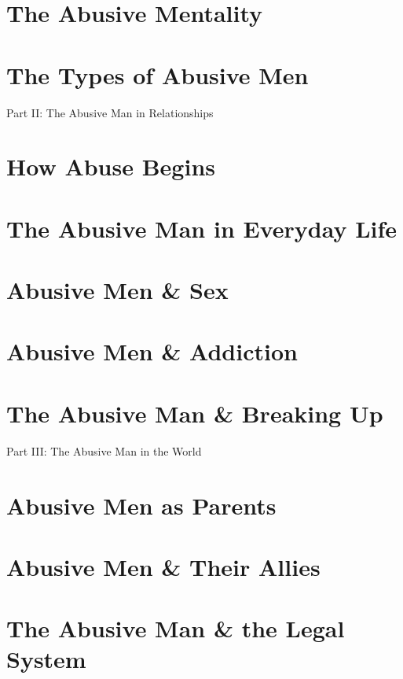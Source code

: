 \documentclass[oneside]{article}
\numberwithin{equation}{section}
\begin{document}
\section{The Abusive Mentality}

\section{The Types of Abusive Men}

\begin{center}
    Part II: The Abusive Man in Relationships
\end{center}

\section{How Abuse Begins}

\section{The Abusive Man in Everyday Life}

\section{Abusive Men \& Sex}

\section{Abusive Men \& Addiction}

\section{The Abusive Man \& Breaking Up}

\begin{center}
    Part III: The Abusive Man in the World
\end{center}

\section{Abusive Men as Parents}

\section{Abusive Men \& Their Allies}

\section{The Abusive Man \& the Legal System}
\end{document}
